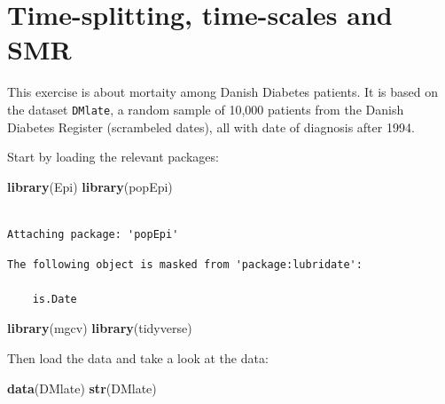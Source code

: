 \documentclass[
]{book}
\newenvironment{Shaded}{\begin{snugshade}}{\end{snugshade}}
\newcommand{\FunctionTok}[1]{\textcolor[rgb]{0.13,0.29,0.53}{\textbf{#1}}}
\newcommand{\NormalTok}[1]{#1}
\begin{document}
\chapter{Time-splitting, time-scales and SMR}\label{time-splitting-time-scales-and-smr}

This exercise is about mortaity among Danish Diabetes patients. It is
based on the dataset \texttt{DMlate}, a random sample of 10,000
patients from the Danish Diabetes Register (scrambeled dates), all
with date of diagnosis after 1994.

Start by loading the relevant packages:

\begin{Shaded}
\begin{Highlighting}[]
\FunctionTok{library}\NormalTok{(Epi)}
\FunctionTok{library}\NormalTok{(popEpi)}
\end{Highlighting}
\end{Shaded}

\begin{verbatim}

Attaching package: 'popEpi'
\end{verbatim}

\begin{verbatim}
The following object is masked from 'package:lubridate':

    is.Date
\end{verbatim}

\begin{Shaded}
\begin{Highlighting}[]
\FunctionTok{library}\NormalTok{(mgcv)}
\FunctionTok{library}\NormalTok{(tidyverse)}
\end{Highlighting}
\end{Shaded}

Then load the data and take a look at the data:

\begin{Shaded}
\begin{Highlighting}[]
\FunctionTok{data}\NormalTok{(DMlate)}
\FunctionTok{str}\NormalTok{(DMlate)}
\end{Highlighting}
\end{Shaded}

\begin{Shaded}
\end{Shaded}
\end{document}
